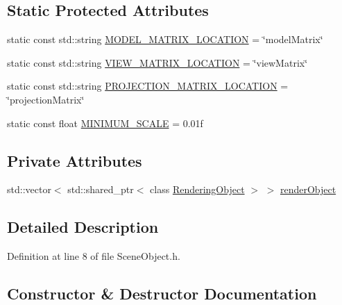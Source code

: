 \subsection*{Static Protected Attributes}
\begin{DoxyCompactItemize}
\item 
static const std\+::string \hyperlink{class_scene_object_a62d236f4f5c52b66bd02d13d09b6ce5e}{M\+O\+D\+E\+L\+\_\+\+M\+A\+T\+R\+I\+X\+\_\+\+L\+O\+C\+A\+T\+I\+O\+N} = \char`\"{}model\+Matrix\char`\"{}
\item 
static const std\+::string \hyperlink{class_scene_object_a1c129ecdd6bd8e2f34c713f5dd183361}{V\+I\+E\+W\+\_\+\+M\+A\+T\+R\+I\+X\+\_\+\+L\+O\+C\+A\+T\+I\+O\+N} = \char`\"{}view\+Matrix\char`\"{}
\item 
static const std\+::string \hyperlink{class_scene_object_ad9a8c9c39a4a262c5e379c0bda184541}{P\+R\+O\+J\+E\+C\+T\+I\+O\+N\+\_\+\+M\+A\+T\+R\+I\+X\+\_\+\+L\+O\+C\+A\+T\+I\+O\+N} = \char`\"{}projection\+Matrix\char`\"{}
\item 
static const float \hyperlink{class_scene_object_a903eef54277645571794fd87dc8e9fbb}{M\+I\+N\+I\+M\+U\+M\+\_\+\+S\+C\+A\+L\+E} = 0.\+01f
\end{DoxyCompactItemize}
\subsection*{Private Attributes}
\begin{DoxyCompactItemize}
\item 
std\+::vector$<$ std\+::shared\+\_\+ptr$<$ class \hyperlink{class_rendering_object}{Rendering\+Object} $>$ $>$ \hyperlink{class_scene_object_a4bbf98a19bd8e7ddd491fbb9a41b42cf}{render\+Object}
\end{DoxyCompactItemize}


\subsection{Detailed Description}


Definition at line 8 of file Scene\+Object.\+h.



\subsection{Constructor \& Destructor Documentation}
\hypertarget{class_scene_object_a0d268d96d77dbeb45b07a6442e2f4d0d}{}
